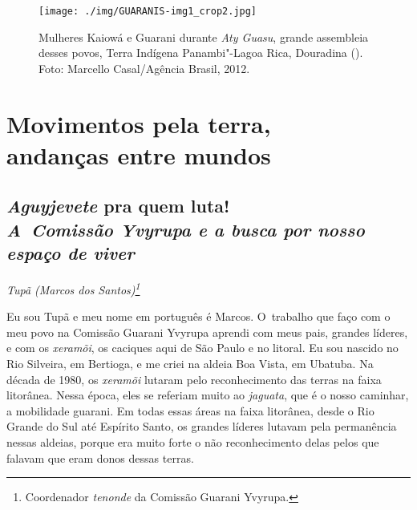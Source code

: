 \pagebreak

\begin{absolutelynopagebreak}
\begin{vplace}
\begin{figure}[H]
\begin{adjustwidth}{-2.7cm}{}
  \vspace{-3.1cm}
  \texttt{[image: ./img/GUARANIS-img1\_crop2.jpg]}	
\end{adjustwidth}
  \caption{Mulheres Kaiowá e Guarani durante \emph{Aty Guasu}, grande assembleia desses
povos, Terra Indígena Panambi"-Lagoa Rica, Douradina (). Foto:
Marcello Casal/Agência Brasil, 2012.}
\end{figure}
\end{vplace}

\thispagestyle{empty}
\end{absolutelynopagebreak}

\makeatletter\@openrightfalse
\movetooddpage
\part{Movimentos pela terra,\\ andanças entre mundos}



\thispagestyle{empty}

\chapter*{\emph{Aguyjevete} pra quem luta!\\
\large{\emph{A~Comissão Yvyrupa e a busca por nosso espaço de viver}}}


\@openrighttrue\makeatother
\begin{flushright}
\emph{Tupã (Marcos dos Santos)\footnote{Coordenador \emph{tenonde} da Comissão
Guarani Yvyrupa.}}
\end{flushright}
\medskip

\noindent
Eu sou Tupã e meu nome em português é Marcos. O~trabalho que faço com o
meu povo na Comissão Guarani Yvyrupa aprendi com meus pais, grandes
líderes, e com os \emph{xeramõi}, os caciques aqui de São Paulo e no litoral.
Eu sou nascido no Rio Silveira, em Bertioga, e me criei na aldeia Boa
Vista, em Ubatuba. Na década de 1980, os \emph{xeramõi} lutaram pelo
reconhecimento das terras na faixa litorânea. Nessa época, eles se
referiam muito ao \emph{jaguata}, que é o nosso caminhar, a mobilidade
guarani. Em todas essas áreas na faixa litorânea, desde o Rio Grande do
Sul até Espírito Santo, os grandes líderes lutavam pela permanência
nessas aldeias, porque era muito forte o não reconhecimento delas pelos
que falavam que eram donos dessas terras. 

